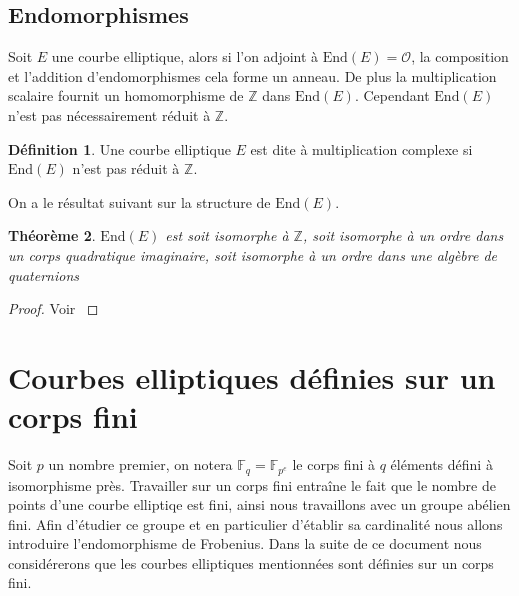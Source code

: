 \documentclass[10pt,a4paper]{book}
\theoremstyle{plain}
\newtheorem{thm}{Théorème}
\theoremstyle{definition}
\theoremstyle{definition}
\theoremstyle{definition}
\theoremstyle{definition}
\newtheorem{defi}[thm]{Définition}
\theoremstyle{remark}
\theoremstyle{remark}
\begin{document}


\subsection{Endomorphismes}

Soit $E$ une courbe elliptique, alors si l'on adjoint à $\mathrm{End}(E)=\mathcal{O}$, la composition et l'addition d'endomorphismes cela forme un anneau. De plus la multiplication scalaire fournit un homomorphisme de $\mathbb{Z}$ dans $\mathrm{End}(E)$. Cependant $\mathrm{End}(E)$ n'est pas nécessairement réduit à $\mathbb{Z}$.

\begin{defi}
Une courbe elliptique $E$ est dite à multiplication complexe si $\mathrm{End}(E)$ n'est pas réduit à $\mathbb{Z}$.
\end{defi}
On a le résultat suivant sur la structure de $\mathrm{End}(E)$.

\begin{thm}
$\mathrm{End}(E)$ est soit isomorphe à $\mathbb{Z}$, soit isomorphe à un ordre dans un corps quadratique imaginaire, soit isomorphe à un ordre dans une algèbre de quaternions 
\end{thm}

\begin{proof}
Voir \cite[Corollary III.9.4]{Silv1}
\end{proof}

\section{Courbes elliptiques définies sur un corps fini}

Soit $p$ un nombre premier, on notera $\mathbb{F}_q=\mathbb{F}_{p^e}$ le corps fini à $q$ éléments défini à isomorphisme près. Travailler sur un corps fini entraîne le fait que le nombre de points d'une courbe elliptiqe est fini, ainsi nous travaillons avec un groupe abélien fini. Afin d'étudier ce groupe et en particulier d'établir sa cardinalité nous allons introduire l'endomorphisme de Frobenius. Dans la suite de ce document nous considérerons que les courbes elliptiques mentionnées sont définies sur un corps fini. 
\end{document}
